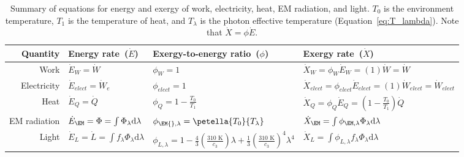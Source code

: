 

\begin{table}
\centering %
\caption{Summary of equations for energy and exergy of work, electricity, heat, EM radiation, and light.
         $T_0$ is the environment temperature, $T_1$ is the temperature of heat, 
         and $T_\lambda$ is the photon effective temperature
         (Equation~\ref{eq:T_lambda}).
         Note that $\dot{X} = \phi \dot{E}$.}
\begin{tabular}{r l l l}
  \toprule
  Quantity & Energy rate~($\dot{E}$) & Exergy-to-energy ratio~($\phi$) & Exergy rate~($\dot{X}$) \\
  \midrule
  Work        
      & $\dot{E}_W = \dot{W}$
      & $\phi_W = 1$
      & $\dot{X}_W = \phi_W \dot{E}_W = (1) \dot{W} = \dot{W}$ \\
  Electricity 
      & $\dot{E}_{elect} = \dot{W}_e$
      & $\phi_{elect} = 1$
      & $\dot{X}_{elect} = \phi_{elect} \dot{E}_{elect} = (1) \dot{W}_{elect} = \dot{W}_{elect}$ \\
  Heat 
      & $\dot{E}_Q = \dot{Q}$   
      & $\phi_Q = 1 - \frac{T_0}{T_1}$  
      & $ \dot{X}_Q = \phi_Q \dot{E}_Q = \left( 1 - \frac{T_0}{T_1} \right) \dot{Q}  $ \\
  EM radiation
      & $\dot{E}_{\EM} = \Phi = \int \Phi_\lambda \mathrm{d}\lambda$ 
      & $\phi_{\EM{},\lambda} = \petella{T_0}{T_\lambda}$ 
      & $\dot{X}_{\EM} = \int \phi_{\EM,\lambda} \Phi_\lambda \mathrm{d}\lambda$ \\
  Light
      & $\dot{E}_L = \dot{L} = \int f_\lambda \Phi_\lambda \mathrm{d}\lambda$
      & $\phi_{L,\lambda} = 1 
                            - \frac{4}{3} \left( \frac{310 \text{ K}}{c_3} \right) \lambda 
                            + \frac{1}{3} \left( \frac{310 \text{ K}}{c_3} \right)^4 \lambda^4$ %
      & $\dot{X}_L = \int \phi_{L,\lambda} f_\lambda \Phi_\lambda \mathrm{d}\lambda$ \\
  \bottomrule
\end{tabular}
\label{tab:EX_summary}
\end{table}


